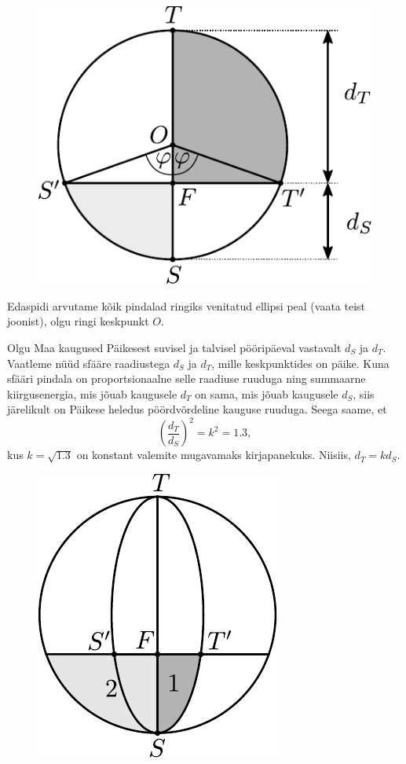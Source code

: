 \begin{figure}[H]
	\centering
	\includegraphics[width=0.4\linewidth]{2020-lahg-09-yl1.pdf}
\end{figure}

Edaspidi arvutame kõik pindalad ringiks venitatud ellipsi peal (vaata teist joonist), olgu ringi keskpunkt $O$.


Olgu Maa kaugused Päikesest suvisel ja talvisel pööripäeval vastavalt $d_S$ ja $d_T$. Vaatleme nüüd sfääre raadiustega $d_S$ ja $d_T$, mille keskpunktides on päike. Kuna sfääri pindala on proportsionaalne selle raadiuse ruuduga ning summaarne kiirgusenergia, mis jõuab kaugusele $d_T$ on sama, mis jõuab kaugusele $d_S$, siis järelikult on Päikese heledus pöördvõrdeline kauguse ruuduga. Seega saame, et
\[
\left(\frac{d_T}{d_S}\right)^2 = k^2 = \num{1.3},
\]
kus $k = \sqrt{\num{1.3}}$ on konstant valemite mugavamaks kirjapanekuks. Niisiis, $d_T = kd_S$.

\begin{figure}[H]
	\centering
	\includegraphics[width=0.6\linewidth]{2020-lahg-09-yl2.pdf}
\end{figure}

